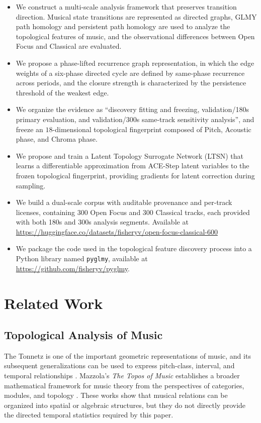 \documentclass{article}
\begin{document}
\begin{itemize}
  \item We construct a multi-scale analysis framework that preserves transition direction. Musical state transitions are represented as directed graphs, GLMY path homology and persistent path homology are used to analyze the topological features of music, and the observational differences between Open Focus and Classical are evaluated.
  \item We propose a phase-lifted recurrence graph representation, in which the edge weights of a six-phase directed cycle are defined by same-phase recurrence across periods, and the closure strength is characterized by the persistence threshold of the weakest edge.
  \item We organize the evidence as ``discovery fitting and freezing, validation/180s primary evaluation, and validation/300s same-track sensitivity analysis'', and freeze an $18$-dimensional topological fingerprint composed of Pitch, Acoustic phase, and Chroma phase.
  \item We propose and train a Latent Topology Surrogate Network (LTSN) that learns a differentiable approximation from ACE-Step latent variables to the frozen topological fingerprint, providing gradients for latent correction during sampling.
  \item We build a dual-scale corpus with auditable provenance and per-track licenses, containing 300 Open Focus and 300 Classical tracks, each provided with both 180s and 300s analysis segments. Available at \url{https://huggingface.co/datasets/fisheryv/open-focus-classical-600}
  \item We package the code used in the topological feature discovery process into a Python library named \texttt{pyglmy}, available at \url{https://github.com/fisheryv/pyglmy}.
\end{itemize}


\section{Related Work}

\subsection{Topological Analysis of Music}

The Tonnetz is one of the important geometric representations of music, and its subsequent generalizations can be used to express pitch-class, interval, and temporal relationships \cite{Yust2020}. Mazzola's \emph{The Topos of Music} establishes a broader mathematical framework for music theory from the perspectives of categories, modules, and topology \cite{Guerino2017}. These works show that musical relations can be organized into spatial or algebraic structures, but they do not directly provide the directed temporal statistics required by this paper.
\end{document}
